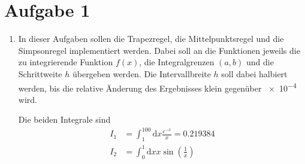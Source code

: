 \section*{Aufgabe 1}

\begin{enumerate}[label=\alph*)]

    \item In dieser Aufgaben sollen die Trapezregel, die Mittelpunktsregel und die Simpsonregel implementiert werden.
    Dabei soll an die Funktionen jeweils die zu integrierende Funktion $f(x)$, die Integralgrenzen $(a,b)$ und die Schrittweite $h$ übergeben werden. 
    Die Intervallbreite $h$ soll dabei halbiert werden, bis die relative Änderung des Ergebnisses klein gegenüber \num{e-4} wird.
    
    Die beiden Integrale sind 
    \begin{align*}
        I_1 &= \int^{100}_1 \mathup{d} x \frac{e^{-x}}{x} = \num{0.219384} \\
        I_2 &= \int^1_0 \mathup{d} x x \sin\left(\frac{1}{x}\right) \\
    \end{align*}

\end{enumerate}

